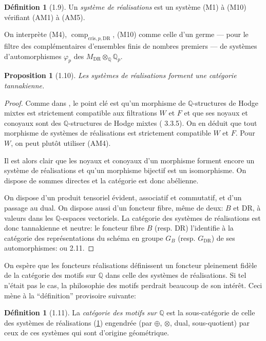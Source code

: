 \documentclass[12pt,a4paper]{article}
\theoremstyle{plain}
\newtheorem{proposition}[theorem]{Proposition}
\theoremstyle{definition}
\newtheorem{definition}[theorem]{D\'efinition}
\theoremstyle{remark}
\providecommand{\DR}{\mathrm{DR}}
\providecommand{\cris}{\mathrm{cris}}
\providecommand{\comp}{\operatorname{comp}}
\begin{document}
\begin{definition}[1.9]\label{def:systeme-realisations}
Un \emph{syst\`eme de r\'ealisations} est un syst\`eme (M1) \`a (M10) v\'erifiant (AM1) \`a
(AM5).

On interpr\`ete (M4), $\comp_{\cris,p,\DR}$, (M10) comme celle d'un germe --- pour le
filtre des compl\'ementaires d'ensembles finis de nombres premiers --- de syst\`emes
d'automorphismes $\varphi_p$ des $M_{\DR} \otimes_{\mathbb{Q}} \mathbb{Q}_p$.
\end{definition}

\begin{proposition}[1.10]\label{prop:1.10}
Les syst\`emes de r\'ealisations forment une cat\'egorie tannakienne.
\end{proposition}

\begin{proof}
Comme dans \cite{J}, le point cl\'e est qu'un morphisme de $\mathbb{Q}$-structures de Hodge
mixtes est strictement compatible aux filtrations $W$ et $F$ et que ses noyaux et conoyaux
sont des $\mathbb{Q}$-structures de Hodge mixtes (\cite{D2} 3.3.5). On en d\'eduit que tout
morphisme de syst\`emes de r\'ealisations est strictement compatible $W$ et $F$. Pour $W$,
on peut plut\^ot utiliser (AM4).

Il est alors clair que les noyaux et conoyaux d'un morphisme forment encore un syst\`eme
de r\'ealisations et qu'un morphisme bijectif est un isomorphisme. On dispose de sommes
directes et la cat\'egorie est donc ab\'elienne.

On dispose d'un produit tensoriel \'evident, associatif et commutatif, et d'un passage au
dual. On dispose aussi d'un foncteur fibre, m\^eme de deux: $B$ et $\DR$, \`a valeurs dans
les $\mathbb{Q}$-espaces vectoriels. La cat\'egorie des syst\`emes de r\'ealisations est donc
tannakienne et neutre: le foncteur fibre $B$ (resp. $\DR$) l'identifie \`a la cat\'egorie
des repr\'esentations du sch\'ema en groupe $G_B$ (resp. $G_\DR$) de ses automorphismes:
\cite{Sa} ou \cite{DM} 2.11.
\end{proof}

On esp\`ere que les foncteurs r\'ealisations d\'efinissent un foncteur pleinement fid\`ele
de la cat\'egorie des motifs sur $\mathbb{Q}$ dans celle des syst\`emes de r\'ealisations. Si
tel n'\'etait pas le cas, la philosophie des motifs perdrait beaucoup de son int\'er\^et.
Ceci m\`ene \`a la ``d\'efinition'' provisoire suivante:

\begin{definition}[1.11]\label{def:1.11}
La \emph{cat\'egorie des motifs sur $\mathbb{Q}$} est la sous-cat\'egorie de celle des
syst\`emes de r\'ealisations (\ref{def:systeme-realisations}) engendr\'ee (par $\oplus$,
$\otimes$, dual, sous-quotient) par ceux de ces syst\`emes qui sont d'origine
g\'eom\'etrique.
\end{definition}
\end{document}
